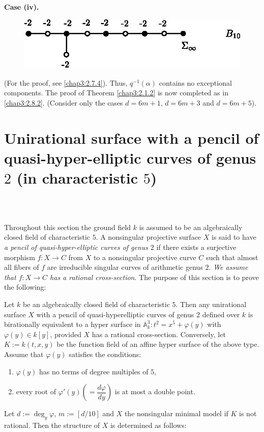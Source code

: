 \noindent
{\bf Case (iv).}
\begin{figure}[H]
\centering
\includegraphics{figures/miyansi_fig28.eps}
\end{figure}
\noindent
(For the proof, see \ref{chap3:2.7.4}). Thus, $q^{-1}(\alpha)$ contains no
exceptional components. The proof of Theorem \ref{chap3:2.1.2} is now
completed as in \ref{chap3:2.8.2}. (Consider only the cases $d=6m+1$,
$d=6m+3$ and $d=6m+5$). 

\section[Unirational surface with.....]{Unirational surface with a pencil of quasi-hyper-elliptic
  curves of genus $2$ (in characteristic
  $5$)}\label{chap3:chap3-sec3}\pageoriginale\

\subsection{}\label{chap3:3.1}
Throughout this section the ground field $k$ is assumed to be an
algebraically closed field of characteristic $5$. A nonsingular
projective surface $X$ is said to have {\em a pencil of
  quasi-hyper-elliptic curves of genus} $2$ if there exists a
surjective morphism $f:X\to C$ from $X$ to a nonsingular projective
curve $C$ such that almost all fibers of $f$ are irreducible singular
curves of arithmetic genus $2$. {\em We assume that $f:X\to C$ has a
  rational cross-section}. The purpose of this section is to prove the
following: 

\begin{theorem*}
Let $k$ be an algebraically closed field of characteristic $5$. Then
any unirational surface $X$ with a pencil of quasi-hyperelliptic\break 
curves of genus 2 defined over $k$ is birationally equivalent to a
hyper surface in $\mathbb{A}^{3}_{k}:t^{2}=x^{5}+\varphi(y)$ with
$\varphi(y)\in k[y]$, provided $X$ has a rational
cross-section. Conversely, let $K:=k(t,x,y)$ be the function field of
an affine hyper surface of the above type. Assume that $\varphi(y)$
satisfies the conditions:
\begin{enumerate}
\renewcommand{\labelenumi}{\rm(\theenumi)}
\item $\varphi(y)$ has no terms of degree multiples of $5$,

\item every root of $\varphi'(y)\left(=\dfrac{d\varphi}{dy}\right)$ is at most a
  double point.
\end{enumerate}
Let $d:=\deg_{y}\varphi$, $m:=[d/10]$ and $X$ the nonsingular minimal
model if $K$ is not rational. Then the structure of $X$ is determined
as follows:
\end{theorem*}

